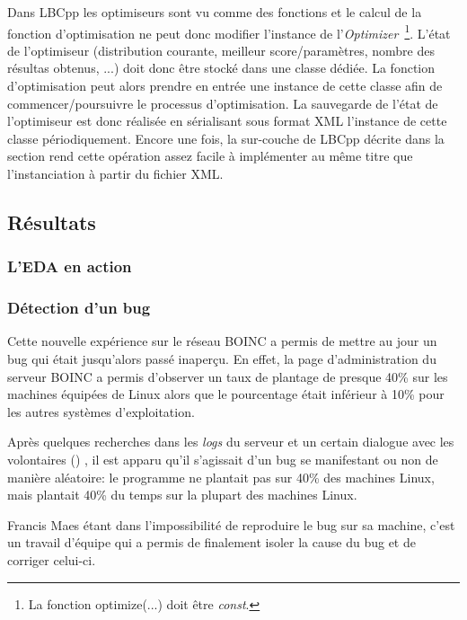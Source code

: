 \documentclass[a4paper, 11pt]{article}
\begin{document}
Dans LBCpp les optimiseurs sont vu comme des fonctions et le calcul de la fonction d'optimisation ne peut donc modifier l'instance de l'\textit{Optimizer}~\footnote{La fonction optimize(...) doit être \textit{const}.}. %
L'état de l'optimiseur (distribution courante, meilleur score/paramètres, nombre des résultas obtenus, ...) doit donc être stocké dans une classe dédiée. La fonction d'optimisation peut alors prendre en entrée une instance de cette classe afin de commencer/poursuivre le processus d'optimisation. La sauvegarde de l'état de l'optimiseur est donc réalisée en sérialisant sous format XML l'instance de cette classe périodiquement. Encore une fois, la sur-couche de LBCpp décrite dans la section %
rend cette opération assez facile à implémenter au même titre que l'instanciation à partir du fichier XML.

\subsection{Résultats}

\subsubsection{L'EDA en action}

\subsubsection{Détection d'un bug}
Cette nouvelle expérience sur le réseau \textsc{BOINC} a permis de mettre au jour un bug qui était jusqu'alors passé inaperçu. En effet, la page d'administration du serveur \textsc{BOINC} a permis d'observer un taux de plantage de presque 40\% sur les machines équipées de Linux alors que le pourcentage était inférieur à 10\% pour les autres systèmes d'exploitation.

Après quelques recherches dans les \textit{logs} du serveur et un certain dialogue avec les volontaires ()%
, il est apparu qu'il s'agissait d'un bug se manifestant ou non de manière aléatoire: le programme ne plantait pas sur 40\% des machines Linux, mais plantait 40\% du temps sur la plupart des machines Linux.

Francis Maes étant dans l'impossibilité de reproduire le bug sur sa machine, c'est un travail d'équipe qui a permis de finalement isoler la cause du bug et de corriger celui-ci. %
\end{document}
